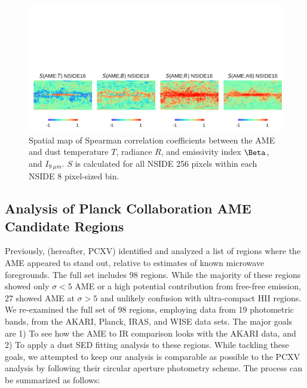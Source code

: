 \documentclass[preprint2,longabstract]{aastex}
\begin{document}

      \begin{figure}
        \label{fig:Spearman_Map_nside16_AMEtoMBBandA9}
        \includegraphics[width=160mm, trim={0 0 0 50mm},clip]{../Plots/Spearman_Map_nside16_AMEtoMBBandA9.pdf}
        \centering
        \caption{Spatial map of Spearman correlation coefficients between the AME and dust temperature $T$, radiance $R$, and emissivity index $\Beta$, and $I_{9~\mu{}m}.$ $S$ is calculated for all NSIDE 256 pixels within each NSIDE 8 pixel-sized bin.  }
      \end{figure}



\subsection{Analysis of Planck Collaboration AME Candidate Regions}

     Previously, \cite{planckXV} (hereafter, PCXV) identified and analyzed a list of regions where the AME appeared to stand out, relative to estimates of known microwave foregrounds. The full set includes 98 regions. While the majority of these regions showed only $\sigma{} < 5$ AME or a high potential contribution from free-free emission, 27 showed AME at $\sigma{} > 5$ and unlikely confusion with ultra-compact HII regions. We re-examined the full set of 98 regions, employing data from 19 photometric bands, from the AKARI, Planck, IRAS, and WISE data sets. The major goals are 1) To see how the AME to IR comparison looks with the AKARI data, and 2) To apply a dust SED fitting analysis to these regions. While tackling these goals, we attempted to keep our analysis is comparable as possible to the PCXV analysis by following their circular aperture photometry scheme. The process can be summarized as follows:
\end{document}
